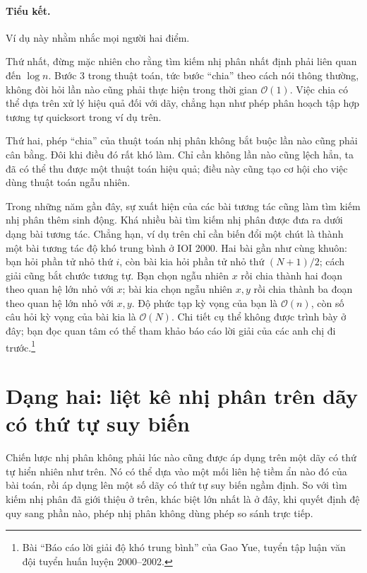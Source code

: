 \documentclass[11pt]{article}
\newcommand{\Oh}{\mathcal{O}}
\begin{document}
\paragraph{Tiểu kết.}
Ví dụ này nhằm nhắc mọi người hai điểm.

Thứ nhất, đừng mặc nhiên cho rằng tìm kiếm nhị phân nhất định phải liên quan
đến $\log n$. Bước 3 trong thuật toán, tức bước ``chia'' theo cách nói thông
thường, không đòi hỏi lần nào cũng phải thực hiện trong thời gian $\Oh(1)$.
Việc chia có thể dựa trên xử lý hiệu quả đối với dãy, chẳng hạn như phép phân
hoạch tập hợp tương tự quicksort trong ví dụ trên.

Thứ hai, phép ``chia'' của thuật toán nhị phân không bắt buộc lần nào cũng
phải cân bằng. Đôi khi điều đó rất khó làm. Chỉ cần không lần nào cũng lệch
hẳn, ta đã có thể thu được một thuật toán hiệu quả; điều này cũng tạo cơ hội
cho việc dùng thuật toán ngẫu nhiên.

Trong những năm gần đây, sự xuất hiện của các bài tương tác cũng làm tìm kiếm
nhị phân thêm sinh động. Khá nhiều bài tìm kiếm nhị phân được đưa ra dưới dạng
bài tương tác. Chẳng hạn, ví dụ trên chỉ cần biến đổi một chút là thành một
bài tương tác độ khó trung bình ở IOI 2000. Hai bài gần như cùng khuôn: bạn
hỏi phần tử nhỏ thứ $i$, còn bài kia hỏi phần tử nhỏ thứ $(N+1)/2$; cách giải
cũng bắt chước tương tự. Bạn chọn ngẫu nhiên $x$ rồi chia thành hai đoạn theo
quan hệ lớn nhỏ với $x$; bài kia chọn ngẫu nhiên $x,y$ rồi chia thành ba đoạn
theo quan hệ lớn nhỏ với $x,y$. Độ phức tạp kỳ vọng của bạn là $\Oh(n)$, còn
số câu hỏi kỳ vọng của bài kia là $\Oh(N)$. Chi tiết cụ thể không được trình
bày ở đây; bạn đọc quan tâm có thể tham khảo báo cáo lời giải của các anh chị
đi trước.\footnote{Bài ``Báo cáo lời giải độ khó trung bình'' của Gao Yue,
tuyển tập luận văn đội tuyển huấn luyện 2000--2002.}

\section{Dạng hai: liệt kê nhị phân trên dãy có thứ tự suy biến}

Chiến lược nhị phân không phải lúc nào cũng được áp dụng trên một dãy có thứ
tự hiển nhiên như trên. Nó có thể dựa vào một mối liên hệ tiềm ẩn nào đó của
bài toán, rồi áp dụng lên một số dãy có thứ tự suy biến ngầm định. So với tìm
kiếm nhị phân đã giới thiệu ở trên, khác biệt lớn nhất là ở đây, khi quyết
định đệ quy sang phần nào, phép nhị phân không dùng phép so sánh trực tiếp.
\end{document}
